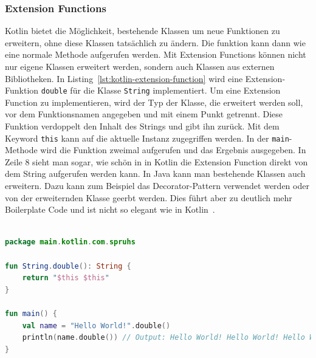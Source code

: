 \documentclass[11pt]{article}
\begin{document}
    \subsubsection{Extension Functions}
    Kotlin bietet die Möglichkeit, bestehende Klassen um neue Funktionen zu erweitern, ohne diese Klassen tatsächlich zu ändern.
    Die funktion kann dann wie eine normale Methode aufgerufen werden.
    Mit Extension Functions können nicht nur eigene Klassen erweitert werden, sondern auch Klassen aus externen Bibliotheken.
    In Listing~\ref{lst:kotlin-extension-function} wird eine Extension-Funktion \texttt{double} für die Klasse \texttt{String} implementiert.
    Um eine Extension Function zu implementieren, wird der Typ der Klasse, die erweitert werden soll, vor dem Funktionsnamen angegeben und mit einem Punkt getrennt.
    Diese Funktion verdoppelt den Inhalt des Strings und gibt ihn zurück.
    Mit dem Keyword \texttt{this} kann auf die aktuelle Instanz zugegriffen werden.
    In der \texttt{main}-Methode wird die Funktion zweimal aufgerufen und das Ergebnis ausgegeben.
    In Zeile 8 sieht man sogar, wie schön in in Kotlin die Extension Function direkt von dem String aufgerufen werden kann.
    In Java kann man bestehende Klassen auch erweitern.
    Dazu kann zum Beispiel das Decorator-Pattern verwendet werden oder von der erweiternden Klasse geerbt werden.
    Dies führt aber zu deutlich mehr Boilerplate Code und ist nicht so elegant wie in Kotlin~\cite{kotlin-extensions}.\\
    \\

    \begin{lstlisting}[language=Kotlin, caption={ExtensionFunction.kt}, label={lst:kotlin-extension-function}]
package main.kotlin.com.spruhs

fun String.double(): String {
    return "$this $this"
}

fun main() {
    val name = "Hello World!".double()
    println(name.double()) // Output: Hello World! Hello World! Hello World! Hello World!
}
    \end{lstlisting}
\end{document}
